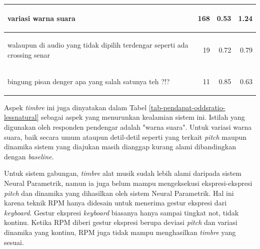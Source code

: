 \begin{table}[htbp]
\begin{center}
\begin{tabular}{|p{}|r|r|r|}
\begin{intabquote}variasi warna suara\end{intabquote}&	168&	0.53&	1.24\\\hline
\begin{intabquote}walaupun di audio yang tidak dipilih terdengar seperti ada crossing senar\end{intabquote}&	19&	0.72&	0.79\\\hline
\begin{intabquote}bingung pisan denger apa yang salah satunya teh ?!?\end{intabquote}&	11&	0.85&	0.63\\\hline
	\end{tabular}
  \end{center}
\end{table}

Aspek \textit{timbre} ini juga dinyatakan dalam Tabel \ref{tab-pendapat-oddsratio-lessnatural} sebagai aspek yang menurunkan kealamian sistem ini. Istilah yang digunakan oleh responden pendengar adalah "warna suara". Untuk variasi warna suara, baik secara umum ataupun detil-detil seperti yang terkait \textit{pitch} maupun dinamika sistem yang diajukan masih dianggap kurang alami dibandingkan dengan \textit{baseline}.

Untuk sistem gabungan, \textit{timbre} alat musik sudah lebih alami daripada sistem Neural Parametrik, namun ia juga belum mampu mengeksekusi ekspresi-ekspresi \textit{pitch} dan dinamika yang dihasilkan oleh sistem Neural Parametrik. Hal ini karena teknik RPM hanya didesain untuk menerima gestur ekspresi dari \textit{keyboard}. Gestur ekspresi \textit{keyboard} biasanya hanya sampai tingkat not, tidak kontinu. Ketika RPM diberi gestur ekspresi berupa deviasi \textit{pitch} dan variasi dinamika yang kontinu, RPM juga tidak mampu menghasilkan \textit{timbre} yang sesuai.

